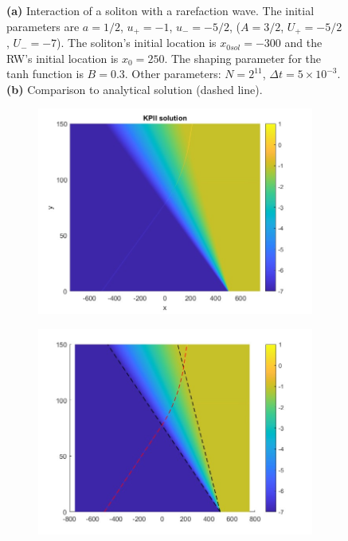 \documentclass[12pt]{article}
\numberwithin{equation}{section}
\begin{document}
\begin{figure}[h!]
\begin{subfigure}[b]{.45\textwidth}
         \caption{}
     \end{subfigure}
        \caption{\textbf{(a)} Interaction of a soliton with a rarefaction wave. The initial parameters are $a = 1/2$, $u_+ = - 1$, $u_- = -5/2$, ($A = 3/2$, $U_+ = -5/2$, $U_- = -7$). The soliton's initial location is $x_{0sol} = -300$ and the RW's initial location is $x_0 = 250$. The shaping parameter for the tanh function is $B = 0.3$. Other parameters: $N = 2^{11}$, $\Delta t = 5\times10^{-3}$. \textbf{(b)} Comparison to analytical solution (dashed line).} 
        \label{fig:comparison narrower}
\end{figure}

\begin{figure}[h!]
     \centering
     \begin{subfigure}[b]{.45\textwidth}
        \centering
        \includegraphics[width = \textwidth]{figures/KPIIsolitonRW2.jpg}
         \caption{}
     \end{subfigure}
     \hfill
     \begin{subfigure}[b]{.45\textwidth}
        \centering
        \includegraphics[width = \textwidth]{figures/KPIIsolitonRW2_comp.jpg}

\end{subfigure}
\end{figure}
\end{document}
